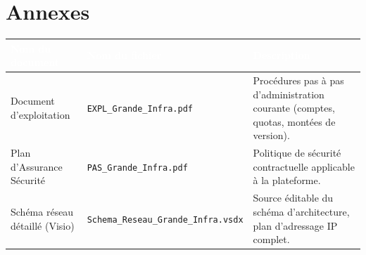 \documentclass[11pt,a4paper]{report}
\newcommand{\tblhead}[1]{\textcolor{white}{\textbf{#1}}}
\begin{document}
\chapter{Annexes}
\begin{longtable}{|p{4cm}|p{4cm}|p{5.5cm}|}
\hline
\rowcolor{primary}\tblhead{Nom du document} & \tblhead{Nom du fichier} & \tblhead{Description} \\
\hline
\endhead
Document d'exploitation & \texttt{EXPL\_Grande\_Infra.\allowbreak{}pdf} & Procédures pas à pas d'administration courante (comptes, quotas, montées de version).\allowbreak{} \\
\hline
Plan d'Assurance Sécurité & \texttt{PAS\_Grande\_Infra.\allowbreak{}pdf} & Politique de sécurité contractuelle applicable à la plateforme.\allowbreak{} \\
\hline
Schéma réseau détaillé (Visio) & \texttt{Schema\_Reseau\_Grande\_Infra.\allowbreak{}vsdx} & Source éditable du schéma d'architecture, plan d'adressage IP complet.\allowbreak{} \\
\hline
\end{longtable}
\end{document}
